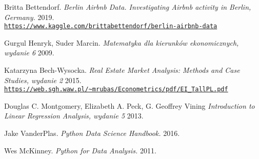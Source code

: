 \begin{thebibliography}{9}
    Britta Bettendorf.
    \textit{Berlin Airbnb Data.
    Investigating Airbnb activity in Berlin, Germany.} 2019.
    \\\texttt{\url{https://www.kaggle.com/brittabettendorf/berlin-airbnb-data}}

    Gurgul Henryk, Suder Marcin.
    \textit{Matematyka dla kierunków ekonomicznych, wydanie 6} 2009.

    Katarzyna Bech-Wysocka.
    \textit{Real Estate Market Analysis: Methods and Case Studies, wydanie 2} 2015.
    \\\texttt{\url{https://web.sgh.waw.pl/~mrubas/Econometrics/pdf/EI_TallPL.pdf}}

    Douglas C. Montgomery, Elizabeth A. Peck, G. Geoffrey Vining
    \textit{Introduction to Linear Regression Analysis, wydanie 5} 2013.

    Jake VanderPlas.
    \textit{Python Data Science Handbook.} 2016.

    Wes McKinney.
    \textit{Python for Data Analysis.} 2011.


\end{thebibliography}